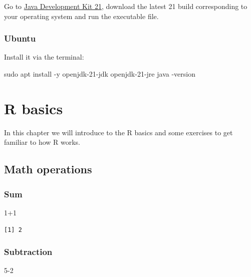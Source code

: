 \documentclass[
  letterpaper,
  DIV=11,
  numbers=noendperiod]{scrreprt}
\newenvironment{Shaded}{\begin{snugshade}}{\end{snugshade}}
\newcommand{\AttributeTok}[1]{\textcolor[rgb]{0.40,0.45,0.13}{#1}}
\newcommand{\DecValTok}[1]{\textcolor[rgb]{0.68,0.00,0.00}{#1}}
\newcommand{\ExtensionTok}[1]{\textcolor[rgb]{0.00,0.23,0.31}{#1}}
\newcommand{\FunctionTok}[1]{\textcolor[rgb]{0.28,0.35,0.67}{#1}}
\newcommand{\NormalTok}[1]{\textcolor[rgb]{0.00,0.23,0.31}{#1}}
\newcommand{\SpecialCharTok}[1]{\textcolor[rgb]{0.37,0.37,0.37}{#1}}
\begin{document}
Go to \href{https://jdk.java.net/archive/}{Java Development Kit 21},
download the latest 21 build corresponding to your operating system and
run the executable file.

\subsection{Ubuntu}

Install it via the terminal:

\begin{Shaded}
\begin{Highlighting}[]
\FunctionTok{sudo}\NormalTok{ apt install }\AttributeTok{{-}y}\NormalTok{ openjdk{-}21{-}jdk openjdk{-}21{-}jre}
\ExtensionTok{java} \AttributeTok{{-}version}
\end{Highlighting}
\end{Shaded}

\chapter{R basics}\label{r-basics}

In this chapter we will introduce to the R basics and some exercises to
get familiar to how R works.

\section{Math operations}\label{math-operations}

\subsection{Sum}\label{sum}

\begin{Shaded}
\begin{Highlighting}[]
\DecValTok{1}\SpecialCharTok{+}\DecValTok{1}
\end{Highlighting}
\end{Shaded}

\begin{verbatim}
[1] 2
\end{verbatim}

\subsection{Subtraction}\label{subtraction}

\begin{Shaded}
\begin{Highlighting}[]
\DecValTok{5{-}2}
\end{Highlighting}
\end{Shaded}
\end{document}

